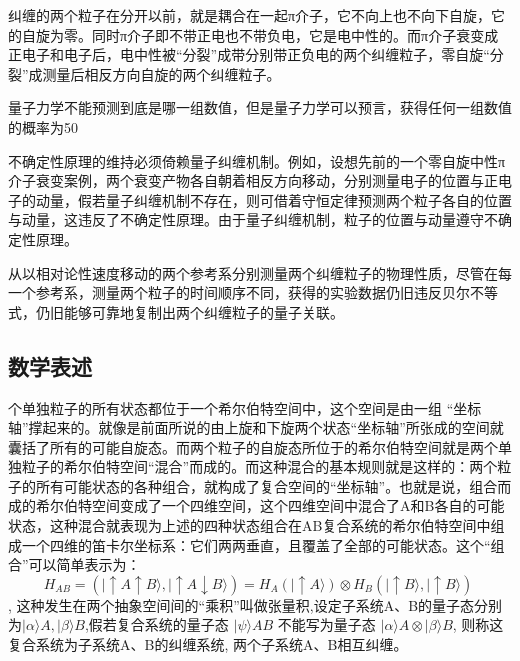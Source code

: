        纠缠的两个粒子在分开以前，就是耦合在一起π介子，它不向上也不向下自旋，它的自旋为零。同时π介子即不带正电也不带负电，它是电中性的。而π介子衰变成正电子和电子后，电中性被“分裂”成带分别带正负电的两个纠缠粒子，零自旋“分裂”成测量后相反方向自旋的两个纠缠粒子。

       量子力学不能预测到底是哪一组数值，但是量子力学可以预言，获得任何一组数值的概率为50%

       不确定性原理的维持必须倚赖量子纠缠机制。例如，设想先前的一个零自旋中性π介子衰变案例，两个衰变产物各自朝着相反方向移动，分别测量电子的位置与正电子的动量，假若量子纠缠机制不存在，则可借着守恒定律预测两个粒子各自的位置与动量，这违反了不确定性原理。由于量子纠缠机制，粒子的位置与动量遵守不确定性原理。

从以相对论性速度移动的两个参考系分别测量两个纠缠粒子的物理性质，尽管在每一个参考系，测量两个粒子的时间顺序不同，获得的实验数据仍旧违反贝尔不等式，仍旧能够可靠地复制出两个纠缠粒子的量子关联。

\subsection{数学表述}
个单独粒子的所有状态都位于一个希尔伯特空间中，这个空间是由一组 “坐标轴”撑起来的。就像是前面所说的由上旋和下旋两个状态“坐标轴”所张成的空间就囊括了所有的可能自旋态。而两个粒子的自旋态所位于的希尔伯特空间就是两个单独粒子的希尔伯特空间“混合”而成的。而这种混合的基本规则就是这样的：两个粒子的所有可能状态的各种组合，就构成了复合空间的“坐标轴”。也就是说，组合而成的希尔伯特空间变成了一个四维空间，这个四维空间中混合了A和B各自的可能状态，这种混合就表现为上述的四种状态组合在AB复合系统的希尔伯特空间中组成一个四维的笛卡尔坐标系：它们两两垂直，且覆盖了全部的可能状态。这个“组合”可以简单表示为：
$$H_{AB} = (|\uparrow A \uparrow B \rangle, |\uparrow A \downarrow B \rangle) = H_A (|\uparrow A \rangle) \otimes H_B (|\uparrow B \rangle, |\uparrow B \rangle)~$$,
这种发生在两个抽象空间间的“乘积”叫做张量积,设定子系统A、B的量子态分别为$|\alpha \rangle A, |\beta \rangle B$,假若复合系统的量子态 $|\psi \rangle AB$ 不能写为量子态 $|\alpha \rangle A \otimes |\beta \rangle B$, 则称这复合系统为子系统A、B的纠缠系统, 两个子系统A、B相互纠缠。
